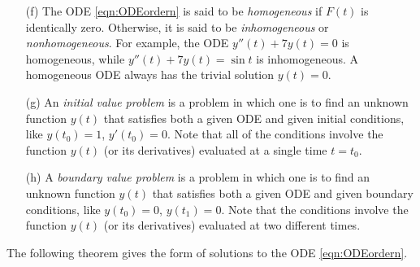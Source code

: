 \addtocounter{theorem}{-1}
\begin{defn}[continued]
\begin{enumerate}[(a)]

\item[(f)] %
The ODE \eqref{eqn:ODEordern} is said to be \emph{homogeneous} if $F(t)$ 
is identically zero. Otherwise, it is said to be \emph{inhomogeneous} or 
\emph{nonhomogeneous}. For example, the ODE $y''(t)+7y(t)=0$ is homogeneous, 
while  $y''(t)+7y(t)=\sin t$ is inhomogeneous. A homogeneous ODE always
has the trivial solution $y(t)=0$.

\item[(g)] %
An \emph{initial value problem}  is a problem in which one is to find
an unknown function $y(t)$ that satisfies both a given ODE and given
initial conditions, like $y(t_0)=1$, $y'(t_0)=0$. Note that all of the 
conditions involve the function $y(t)$ (or its derivatives) evaluated at 
a single time $t=t_0$.

\item[(h)] %
A \emph{boundary value problem}  is a problem in which one is to find
an unknown function $y(t)$ that satisfies both a given ODE and given
boundary conditions, like $y(t_0)=0$, $y(t_1)=0$. Note that the conditions 
involve the function $y(t)$ (or its derivatives) evaluated at two different 
times. 


\end{enumerate}
\end{defn}


\noindent The following theorem gives the form of solutions to the ODE
\eqref{eqn:ODEordern}.


